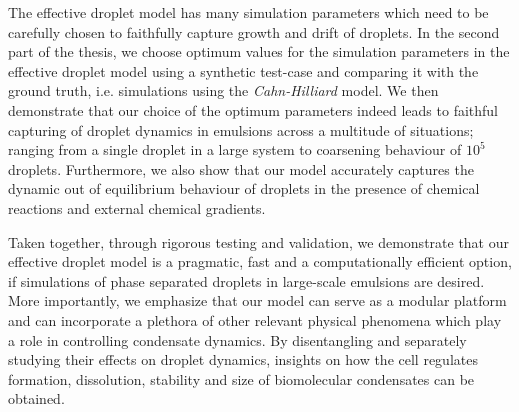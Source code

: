 The effective droplet model has many simulation parameters which need to be carefully chosen to faithfully capture growth and drift of droplets.
In the second part of the thesis, we choose optimum values for the simulation parameters in the effective droplet model using a synthetic test-case and comparing it with the ground truth, i.e. simulations using the \textit{Cahn-Hilliard} model.
We then demonstrate that our choice of the optimum parameters indeed leads to faithful capturing of droplet dynamics in emulsions across a multitude of situations; ranging from a single droplet in a large system to coarsening behaviour of $10^5$ droplets. 
Furthermore, we also show that our model accurately captures the dynamic out of equilibrium behaviour of droplets in the presence of chemical reactions and external chemical gradients.

Taken together, through rigorous testing and validation, we demonstrate that our effective droplet model is a pragmatic, fast and a computationally efficient option, if simulations of phase separated droplets in large-scale emulsions are desired.
More importantly, we emphasize that our model can serve as a modular platform and can incorporate a plethora of other relevant physical phenomena which play a role in controlling condensate dynamics. 
By disentangling and separately studying their effects on droplet dynamics, insights on how the cell regulates formation, dissolution, stability and size of biomolecular condensates can be obtained.
